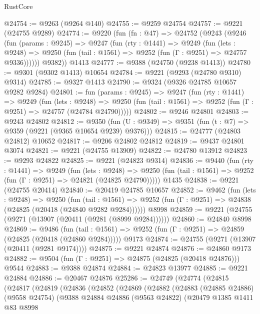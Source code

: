\begin{lexlean}{RustCore}
\begin{coremodule}
@24754 := @9263 (@9264 @140)
@24755 := @9259 @24754
@24757 := @9221 (@24755 @9289)
@24774 := @9220
    (fun (fn : @47) =>
    @24752
      (@9243
        (@9246
          (fun (params : @9245) =>
          @9247
            (fun (rty : @1441) =>
            @9249
              (fun (lets : @9248) =>
              @9250 (fun (tail : @1561) => @9252 (fun (Γ : @9251) => @24757 @9336))))))
        @9382))
    @1413
@24777 := @9388 (@24750 (@9238 @1413))
@24780 := @9301 (@9302 @1413) @10654
@24784 := @9221 (@9293 (@24780 @9310) @9314)
@24785 := @9327 @1413
@24790 := @9324 (@9326 @24785 @10657 @9282 @9284)
@24801 := fun (params : @9245) =>
  @9247
    (fun (rty : @1441) =>
    @9249
      (fun (lets : @9248) =>
      @9250 (fun (tail : @1561) => @9252 (fun (Γ : @9251) => @24757 (@24784 @24790)))))
@24802 := @9246 @24801
@24803 := @9243 @24802
@24812 := @9350
    (fun (U : @9349) => @9351 (fun (t : @7) => @9359 (@9221 (@9365 @10654 @9239) @9376)))
@24815 := @24777 (@24803 @24812) @10652
@24817 := @9206 @24802 @24812
@24819 := @9437 @24801 @3074
@24821 := @9221 (@24755 @13909)
@24822 := @24780 @13912
@24823 := @9293 @24822
@24825 := @9221 (@24823 @9314)
@24836 := @9440
    (fun (rty : @1441) =>
    @9249
      (fun (lets : @9248) =>
      @9250 (fun (tail : @1561) => @9252 (fun (Γ : @9251) => @24821 (@24825 @24790)))))
    @1435
@24838 := @9221 (@24755 @20414)
@24840 := @20419 @24785 @10657
@24852 := @9462
    (fun (lets : @9248) =>
    @9250
      (fun (tail : @1561) =>
      @9252 (fun (Γ : @9251) => @24838 (@24825 (@20418 (@24840 @9282 @9284))))))
    @8998
@24859 := @9221 (@24755 (@9271 (@13907 (@20411 (@9281 (@8999 @9284))))))
@24860 := @24840 @8998
@24869 := @9486
    (fun (tail : @1561) => @9252 (fun (Γ : @9251) => @24859 (@24825 (@20418 (@24860 @9284)))))
    @9173
@24874 := @24755 (@9271 (@13907 (@20411 (@9281 @9174))))
@24875 := @9221 @24874
@24876 := @24860 @9173
@24882 := @9504 (fun (Γ : @9251) => @24875 (@24825 (@20418 @24876))) @9544
@24883 := @9388 @24874
@24884 := @24823 @13977
@24885 := @9221 @24884
@24886 := @20467 @24876
@25286 := @24749
    (@24774
      (@24815
        (@24817
          (@24819
            (@24836
              (@24852
                (@24869
                  (@24882
                    (@24883
                      (@24885 @24886)
                      (@9558 @24754)
                      (@9388
                        @24884
                        @24886
                        (@9563 @24822)
                        (@20479
                          @1385
                          @1411
                          @83
                          @8998

\end{coremodule}
\end{lexlean}
